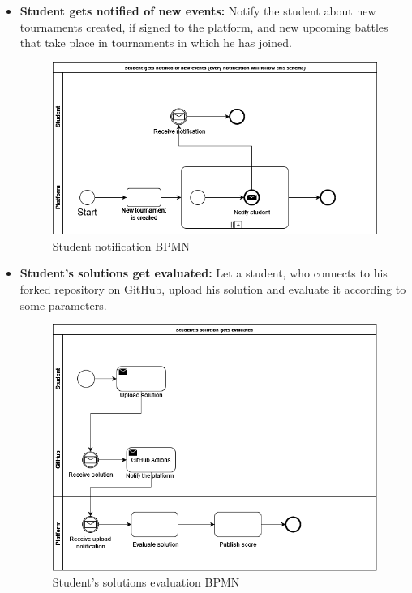 \documentclass{article}
\begin{document}
{\begin{itemize}
            \item \textbf{Student gets notified of new events:} Notify the student about new tournaments created, if signed to the platform, and new upcoming battles that take place in tournaments in which he has joined.
            \begin{figure}[H]
                \centering
                \includegraphics[scale=0.4]{images/BPMN/StudentNotification.png}
                \caption{Student notification BPMN}
                \label{fig:studNotificationBPMN}
            \end{figure}
            
            \item \textbf{Student's solutions get evaluated:} Let a student, who connects to his forked repository on GitHub, upload his solution and evaluate it according to some parameters.
            \begin{figure}[H]
                \centering
                \includegraphics[scale=0.4]{images/BPMN/SolutionEval.png}
                \caption{Student's solutions evaluation BPMN}
                \label{fig:studSolEvalBPMN}
            \end{figure}


\end{itemize}}
\end{document}
